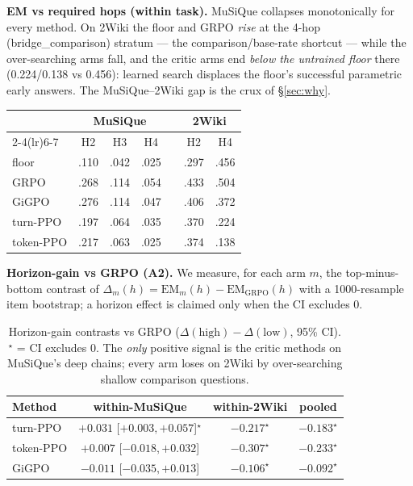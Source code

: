 \documentclass[11pt]{article}
\newcommand{\good}[1]{\textcolor{green!45!black}{#1}}
\newcommand{\bad}[1]{\textcolor{red!70!black}{#1}}
\begin{document}
\begin{minipage}{0.5\linewidth}
\textbf{EM vs required hops (within task).} MuSiQue collapses monotonically for every method.
On 2Wiki the floor and GRPO \emph{rise} at the 4-hop (bridge\_comparison) stratum --- the
comparison/base-rate shortcut --- while the over-searching arms fall, and the critic arms end
\emph{below the untrained floor} there (0.224/0.138 vs 0.456): learned search displaces the
floor's successful parametric early answers. The MuSiQue--2Wiki gap is the crux of \S\ref{sec:why}.
\end{minipage}\hfill
\begin{minipage}{0.46\linewidth}\centering\footnotesize\setlength{\tabcolsep}{4pt}
\begin{tabular}{lccc c cc}
\toprule
& \multicolumn{3}{c}{MuSiQue} && \multicolumn{2}{c}{2Wiki}\\
\cmidrule(lr){2-4}\cmidrule(lr){6-7}
& H2 & H3 & H4 && H2 & H4\\
\midrule
floor    & .110 & .042 & .025 && .297 & .456\\
GRPO     & .268 & .114 & .054 && .433 & .504\\
GiGPO    & .276 & .114 & .047 && .406 & .372\\
turn-PPO & .197 & .064 & .035 && .370 & .224\\
token-PPO & .217 & .063 & .025 && .374 & .138\\
\bottomrule
\end{tabular}
\end{minipage}

\medskip
\textbf{Horizon-gain vs GRPO (A2).} We measure, for each arm $m$, the top-minus-bottom contrast of
$\Delta_m(h){=}\text{EM}_m(h){-}\text{EM}_{\text{GRPO}}(h)$ with a 1000-resample item bootstrap; a
horizon effect is claimed only when the CI excludes 0.

\begin{table}[h]\centering\small
\caption{Horizon-gain contrasts vs GRPO ($\Delta(\text{high}){-}\Delta(\text{low})$, 95\% CI).
$^\star$ = CI excludes 0. The \emph{only} positive signal is the critic methods on MuSiQue's deep
chains; every arm loses on 2Wiki by over-searching shallow comparison questions.}
\begin{tabular}{lccc}
\toprule
Method & within-MuSiQue & within-2Wiki & pooled\\
\midrule
turn-PPO & \good{$+0.031$ [$+0.003,+0.057$]$^\star$} & \bad{$-0.217^\star$} & $-0.183^\star$\\
token-PPO & $+0.007$ [$-0.018,+0.032$] & \bad{$-0.307^\star$} & $-0.233^\star$\\
GiGPO & $-0.011$ [$-0.035,+0.013$] & \bad{$-0.106^\star$} & $-0.092^\star$\\
\bottomrule
\end{tabular}
\end{table}
\end{document}

